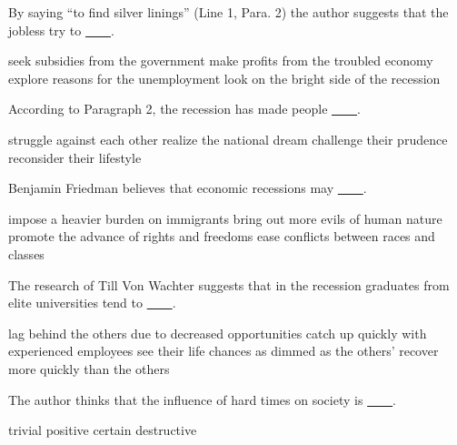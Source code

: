 \item By saying ``to find silver linings'' (Line 1, Para. 2) the author suggests that the jobless try to \uline{~~~~}.
\begin{tasks}
	\task seek subsidies from the government
	\task make profits from the troubled economy
	\task explore reasons for the unemployment
	\task look on the bright side of the recession
\end{tasks}
\item According to Paragraph 2, the recession has made people \uline{~~~~}.
\begin{tasks}
	\task struggle against each other
	\task realize the national dream
	\task challenge their prudence
	\task reconsider their lifestyle
\end{tasks}
\item Benjamin Friedman believes that economic recessions may \uline{~~~~}.
\begin{tasks}
	\task impose a heavier burden on immigrants
	\task bring out more evils of human nature
	\task promote the advance of rights and freedoms
	\task ease conflicts between races and classes
\end{tasks}
\item The research of Till Von Wachter suggests that in the recession graduates from elite universities tend to \uline{~~~~}.
\begin{tasks}
	\task lag behind the others due to decreased opportunities
	\task catch up quickly with experienced employees
	\task see their life chances as dimmed as the others'
	\task recover more quickly than the others
\end{tasks}
\item The author thinks that the influence of hard times on society is \uline{~~~~}.
\begin{tasks}
	\task trivial
	\task positive
	\task certain
	\task destructive
\end{tasks}